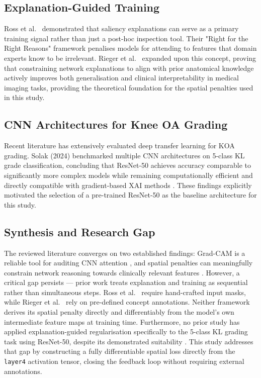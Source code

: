 \documentclass[conference]{IEEEtran}
\begin{document}
\subsection{Explanation-Guided Training}
Ross et al.\ \cite{ross2017} demonstrated that saliency explanations can serve as a primary training signal rather than just a post-hoc inspection tool. Their "Right for the Right Reasons" framework penalises models for attending to features that domain experts know to be irrelevant. Rieger et al.\ \cite{rieger2020} expanded upon this concept, proving that constraining network explanations to align with prior anatomical knowledge actively improves both generalisation and clinical interpretability in medical imaging tasks, providing the theoretical foundation for the spatial penalties used in this study.

\subsection{CNN Architectures for Knee OA Grading}
Recent literature has extensively evaluated deep transfer learning for KOA grading. Solak (2024) benchmarked multiple CNN architectures on 5-class KL grade classification, concluding that ResNet-50 achieves accuracy comparable to significantly more complex models while remaining computationally efficient and directly compatible with gradient-based XAI methods \cite{solak2024}. These findings explicitly motivated the selection of a pre-trained ResNet-50 as the baseline architecture for this study.

\subsection{Synthesis and Research Gap}
The reviewed literature converges on two established findings: Grad-CAM is a reliable tool for auditing CNN attention \cite{selvaraju2017}, and spatial penalties can meaningfully constrain network reasoning towards clinically relevant features \cite{ross2017, rieger2020}. However, a critical gap persists — prior work treats explanation and training as sequential rather than simultaneous steps. Ross et al.\ \cite{ross2017} require hand-crafted input masks, while Rieger et al.\ \cite{rieger2020} rely on pre-defined concept annotations. Neither framework derives its spatial penalty directly and differentiably from the model's own intermediate feature maps at training time. Furthermore, no prior study has applied explanation-guided regularisation specifically to the 5-class KL grading task using ResNet-50, despite its demonstrated suitability \cite{solak2024}. This study addresses that gap by constructing a fully differentiable spatial loss directly from the \texttt{layer4} activation tensor, closing the feedback loop without requiring external annotations.
\end{document}
